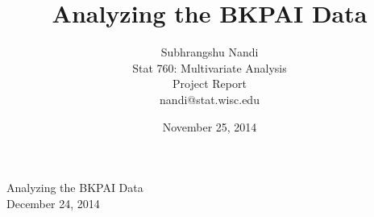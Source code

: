 \documentclass[11pt]{article}
\begin{document}



\title{Analyzing the BKPAI Data}
\author{Subhrangshu Nandi\\
  Stat 760: Multivariate Analysis\\
  Project Report \\
  nandi@stat.wisc.edu}
\date{November 25, 2014}


\begin{center}
{\Large{Analyzing the BKPAI Data}}\\
December 24, 2014
\end{center}
\end{document}
